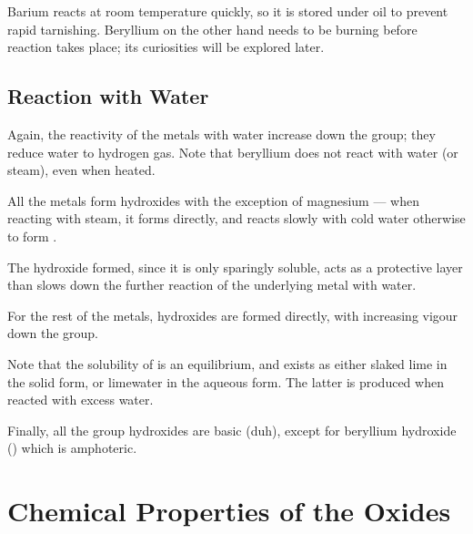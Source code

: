 			Barium reacts at room temperature quickly, so it is stored under oil to prevent rapid tarnishing. Beryllium on the other hand needs
			to be burning before  reaction takes place; its curiosities will be explored later.



		\pagebreak
		\subsection{Reaction with Water}

			Again, the reactivity of the metals with water increase down the group; they reduce water to
			hydrogen gas. Note that beryllium does not react with water (or steam), even when heated.

			All the metals form hydroxides with the exception of magnesium --- when reacting with steam,
			it forms  directly, and reacts slowly with cold water otherwise to form .


			The hydroxide formed, since it is only sparingly soluble, acts as a protective layer than slows down the further reaction of
			the underlying metal with water.

			For the rest of the metals, hydroxides are formed directly, with increasing vigour down the group.


			Note that the solubility of  is an equilibrium, and exists as either slaked lime in
			the solid form, or limewater in the aqueous form. The latter is produced when reacted with excess
			water.

			Finally, all the group \rtwo{} hydroxides are basic (duh), except for beryllium hydroxide
			() which is amphoteric.




	\section{Chemical Properties of the Oxides}

